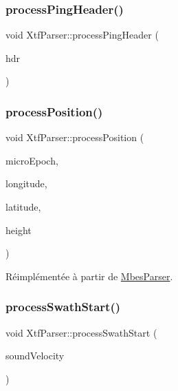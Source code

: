 \subsubsection{\texorpdfstring{process\+Ping\+Header()}{processPingHeader()}}
{\footnotesize\ttfamily void Xtf\+Parser\+::process\+Ping\+Header (\begin{DoxyParamCaption}\item[{\hyperlink{structXtfPingHeader}{Xtf\+Ping\+Header} \&}]{hdr }\end{DoxyParamCaption})\hspace{0.3cm}{\ttfamily [protected]}}

\mbox{\label{classXtfParser_abbb02ef84a6f01696fb1f6ed23d2bb5f}} 
\subsubsection{\texorpdfstring{process\+Position()}{processPosition()}}
{\footnotesize\ttfamily void Xtf\+Parser\+::process\+Position (\begin{DoxyParamCaption}\item[{uint64\+\_\+t}]{micro\+Epoch,  }\item[{double}]{longitude,  }\item[{double}]{latitude,  }\item[{double}]{height }\end{DoxyParamCaption})\hspace{0.3cm}{\ttfamily [virtual]}}



Réimplémentée à partir de \hyperlink{classMbesParser_add86a02726482d3a8e2a8aaf7f4beefa}{Mbes\+Parser}.

\mbox{\label{classXtfParser_a27d3b28415cd8e7f52bbc94fa39d9533}} 
\subsubsection{\texorpdfstring{process\+Swath\+Start()}{processSwathStart()}}
{\footnotesize\ttfamily void Xtf\+Parser\+::process\+Swath\+Start (\begin{DoxyParamCaption}\item[{double}]{sound\+Velocity }\end{DoxyParamCaption})}



